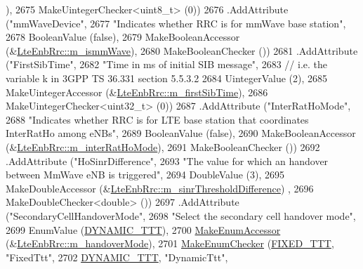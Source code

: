 \begin{DoxyCode}
      ),
2675                    MakeUintegerChecker<uint8\_t> (0))
2676     .AddAttribute (\textcolor{stringliteral}{"mmWaveDevice"},
2677              \textcolor{stringliteral}{"Indicates whether RRC is for mmWave base station"},
2678              BooleanValue (\textcolor{keyword}{false}),
2679              MakeBooleanAccessor (&\hyperlink{classns3_1_1LteEnbRrc_a44515fc06d16f2b477afe0c05425e206}{LteEnbRrc::m\_ismmWave}),
2680              MakeBooleanChecker ())
2681     .AddAttribute (\textcolor{stringliteral}{"FirstSibTime"},
2682                    \textcolor{stringliteral}{"Time in ms of initial SIB message"},
2683                    \textcolor{comment}{// i.e. the variable k in 3GPP TS 36.331 section 5.5.3.2}
2684                    UintegerValue (2),
2685                    MakeUintegerAccessor (&\hyperlink{classns3_1_1LteEnbRrc_a157db9af74b393f8f3f1d78b44e683f5}{LteEnbRrc::m\_firstSibTime}),
2686                    MakeUintegerChecker<uint32\_t> (0)) 
2687     .AddAttribute (\textcolor{stringliteral}{"InterRatHoMode"},
2688              \textcolor{stringliteral}{"Indicates whether RRC is for LTE base station that coordinates InterRatHo among eNBs"},
2689              BooleanValue (\textcolor{keyword}{false}),
2690              MakeBooleanAccessor (&\hyperlink{classns3_1_1LteEnbRrc_a25849018e31a7766dfc839663e4c5ca4}{LteEnbRrc::m\_interRatHoMode}),
2691              MakeBooleanChecker ())
2692     .AddAttribute (\textcolor{stringliteral}{"HoSinrDifference"},
2693              \textcolor{stringliteral}{"The value for which an handover between MmWave eNB is triggered"},
2694              DoubleValue (3),
2695              MakeDoubleAccessor (&\hyperlink{classns3_1_1LteEnbRrc_aef56a65c644f6ed3c5f28a540ded624f}{LteEnbRrc::m\_sinrThresholdDifference})
      ,
2696              MakeDoubleChecker<double> ())
2697     .AddAttribute (\textcolor{stringliteral}{"SecondaryCellHandoverMode"},
2698         \textcolor{stringliteral}{"Select the secondary cell handover mode"},
2699          EnumValue (\hyperlink{classns3_1_1LteEnbRrc_a92c80910218354db2ad7ac531f896c94a8cdb66e30f4eab71f699079471fbf40f}{DYNAMIC\_TTT}),
2700          \hyperlink{namespacens3_af5050739867ce63896dec011e332c8ec}{MakeEnumAccessor} (&\hyperlink{classns3_1_1LteEnbRrc_aa68424e6be8a396baf7fbad34e4dde06}{LteEnbRrc::m\_handoverMode}),
2701          \hyperlink{namespacens3_a48832781a2b521d3d0091e05ece30615}{MakeEnumChecker} (\hyperlink{classns3_1_1LteEnbRrc_a92c80910218354db2ad7ac531f896c94a6981655eb0cd4438cb9d5903d9b04e1a}{FIXED\_TTT}, \textcolor{stringliteral}{"FixedTtt"},
2702                   \hyperlink{classns3_1_1LteEnbRrc_a92c80910218354db2ad7ac531f896c94a8cdb66e30f4eab71f699079471fbf40f}{DYNAMIC\_TTT}, \textcolor{stringliteral}{"DynamicTtt"},

\end{DoxyCode}
